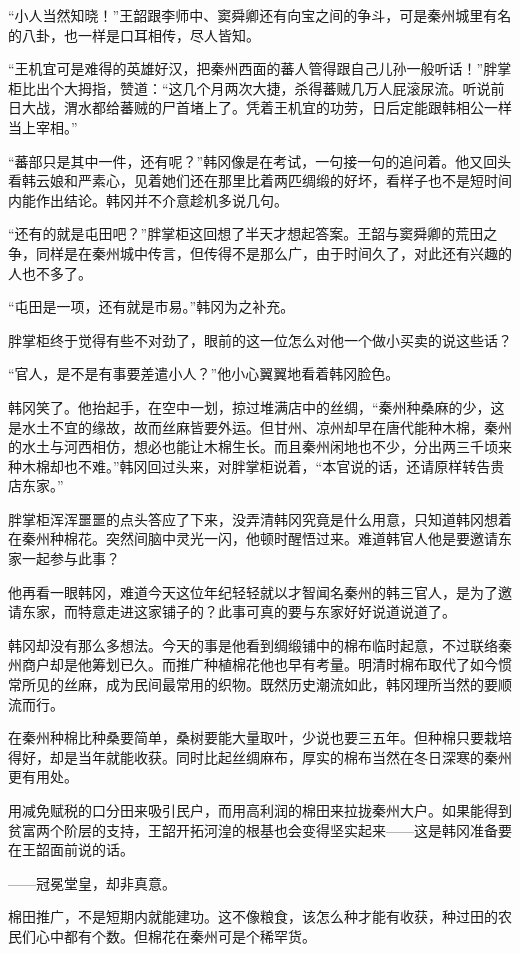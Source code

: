 “小人当然知晓！”王韶跟李师中、窦舜卿还有向宝之间的争斗，可是秦州城里有名的八卦，也一样是口耳相传，尽人皆知。

“王机宜可是难得的英雄好汉，把秦州西面的蕃人管得跟自己儿孙一般听话！”胖掌柜比出个大拇指，赞道：“这几个月两次大捷，杀得蕃贼几万人屁滚尿流。听说前日大战，渭水都给蕃贼的尸首堵上了。凭着王机宜的功劳，日后定能跟韩相公一样当上宰相。”

“蕃部只是其中一件，还有呢？”韩冈像是在考试，一句接一句的追问着。他又回头看韩云娘和严素心，见着她们还在那里比着两匹绸缎的好坏，看样子也不是短时间内能作出结论。韩冈并不介意趁机多说几句。

“还有的就是屯田吧？”胖掌柜这回想了半天才想起答案。王韶与窦舜卿的荒田之争，同样是在秦州城中传言，但传得不是那么广，由于时间久了，对此还有兴趣的人也不多了。

“屯田是一项，还有就是市易。”韩冈为之补充。

胖掌柜终于觉得有些不对劲了，眼前的这一位怎么对他一个做小买卖的说这些话？

“官人，是不是有事要差遣小人？”他小心翼翼地看着韩冈脸色。

韩冈笑了。他抬起手，在空中一划，掠过堆满店中的丝绸，“秦州种桑麻的少，这是水土不宜的缘故，故而丝麻皆要外运。但甘州、凉州却早在唐代能种木棉，秦州的水土与河西相仿，想必也能让木棉生长。而且秦州闲地也不少，分出两三千顷来种木棉却也不难。”韩冈回过头来，对胖掌柜说着，“本官说的话，还请原样转告贵店东家。”

胖掌柜浑浑噩噩的点头答应了下来，没弄清韩冈究竟是什么用意，只知道韩冈想着在秦州种棉花。突然间脑中灵光一闪，他顿时醒悟过来。难道韩官人他是要邀请东家一起参与此事？

他再看一眼韩冈，难道今天这位年纪轻轻就以才智闻名秦州的韩三官人，是为了邀请东家，而特意走进这家铺子的？此事可真的要与东家好好说道说道了。

韩冈却没有那么多想法。今天的事是他看到绸缎铺中的棉布临时起意，不过联络秦州商户却是他筹划已久。而推广种植棉花他也早有考量。明清时棉布取代了如今惯常所见的丝麻，成为民间最常用的织物。既然历史潮流如此，韩冈理所当然的要顺流而行。

在秦州种棉比种桑要简单，桑树要能大量取叶，少说也要三五年。但种棉只要栽培得好，却是当年就能收获。同时比起丝绸麻布，厚实的棉布当然在冬日深寒的秦州更有用处。

用减免赋税的口分田来吸引民户，而用高利润的棉田来拉拢秦州大户。如果能得到贫富两个阶层的支持，王韶开拓河湟的根基也会变得坚实起来——这是韩冈准备要在王韶面前说的话。

——冠冕堂皇，却非真意。

棉田推广，不是短期内就能建功。这不像粮食，该怎么种才能有收获，种过田的农民们心中都有个数。但棉花在秦州可是个稀罕货。

